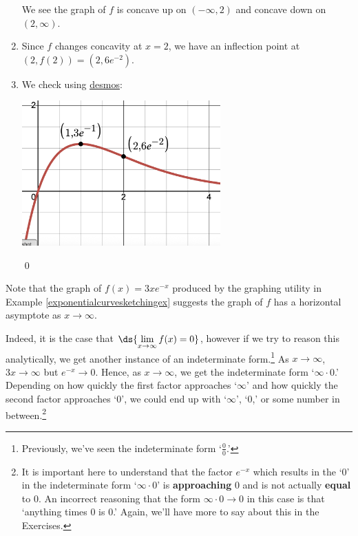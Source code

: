 \documentclass{ximera}
\begin{document}
\begin{ex}
\begin{enumerate}
\begin{center}
\begin{multicols}{2}
\end{multicols}
\end{center}

We see the graph of $f$ is concave up on $(-\infty, 2)$ and concave down on $(2, \infty)$.

\medskip

\item  Since $f$ changes concavity at $x=2$, we have an inflection point at $(2, f(2)) = \left( 2, 6e^{-2} \right)$.

\bigskip

\item We check using \href{https://www.desmos.com/calculator}{\underline{desmos}}:

\bigskip

\centerline{ \includegraphics[width=3in]{./ExponentialEquationsandInequalitiesGraphics/ExpCurveSketchingExample.PNG}}

\hfill \qed

\end{enumerate}


\end{ex}

Note that the graph of $f(x) = 3xe^{-x}$ produced by the graphing utility in  Example \ref{exponentialcurvesketchingex} suggests the graph of $f$ has a horizontal asymptote as $x \rightarrow \infty$.

\medskip

Indeed, it is the case that $\ds{\lim_{x \rightarrow \infty} f(x) = 0}$, however if we try to reason this analytically, we get another instance of an indeterminate form.\footnote{Previously, we've seen the indeterminate form `$\frac{0}{0}$.'}  As $x \rightarrow \infty$, $3x \rightarrow \infty$ but $e^{-x} \rightarrow 0$.  Hence, as $x \rightarrow \infty$, we get the indeterminate form `$\infty \cdot 0$.' Depending on how quickly the first factor approaches `$\infty$' and how quickly the second factor approaches `$0$', we could end up with `$\infty$', `$0$,' or some number in between.\footnote{It is important here to understand that the factor  $e^{-x}$ which results in the `$0$' in the indeterminate form  `$\infty \cdot 0$' is \textbf{approaching} $0$ and is not actually \textbf{equal} to $0$.  An incorrect reasoning that  the form $\infty \cdot 0 \rightarrow 0$ in this case is that `anything times $0$ is $0$.'  Again, we'll have more to say about this in the Exercises.}
\end{document}
